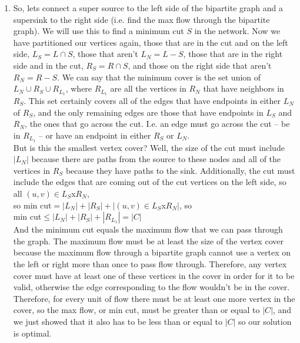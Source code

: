 \documentclass[11pt]{article}
\begin{document}
\begin{enumerate}
\item
So, lets connect a super source to the left side of the bipartite graph and a supersink to the right side (i.e. find the max flow through the bipartite graph). We will use this to find a minimum cut $S$ in the network. Now we have partitioned our vertices again, those that are in the cut and on the left side, $L_S=L\cap S$, those that aren't $L_N=L-S$, those that are in the right side and in the cut, $R_S=R\cap S$, and those on the right side that aren't $R_N=R-S$. We can say that the minimum cover is the set union of $L_N\cup R_S\cup R_{L_1}$, where $R_{L_1}$ are all the vertices in $R_N$ that have neighbors in $R_S$. This set certainly covers all of the edges that have endpoints in either $L_N$ of $R_S$, and the only remaining edges are those that have endpoints in $L_S$ and $R_N$, the ones that go across the cut. I.e. an edge must go across the cut -- be in $R_{L_1}$ -- or have an endpoint in either $R_S$ or $L_N$.\\
But is this the smallest vertex cover? Well, the size of the cut must include $|L_N|$ because there are paths from the source to these nodes and all of the vertices in $R_S$ because they have paths to the sink. Additionally, the cut must include the edges that are coming out of the cut vertices on the left side, so all $(u,v)\in L_S$x$R_N$, \\
so min cut$=|L_N|+|R_S|+|(u,v)\in L_S$x$R_N|$, so\\
min cut$\le |L_N|+|R_S|+|R_{L_1}|=|C|$\\
And the minimum cut equals the maximum flow that we can pass through the graph. The maximum flow must be at least the size of the vertex cover because the maximum flow through a bipartite graph cannot use a vertex on the left or right more than once to pass flow through. Therefore, any vertex cover must have at least one of these vertices in the cover in order for it to be valid, otherwise the edge corresponding to the flow wouldn't be in the cover. Therefore, for every unit of flow there must be at least one more vertex in the cover, so the max flow, or min cut, must be greater than or equal to $|C|$, and we just showed that it also has to be less than or equal to $|C|$ so our solution is optimal.


\end{enumerate}
\end{document}
